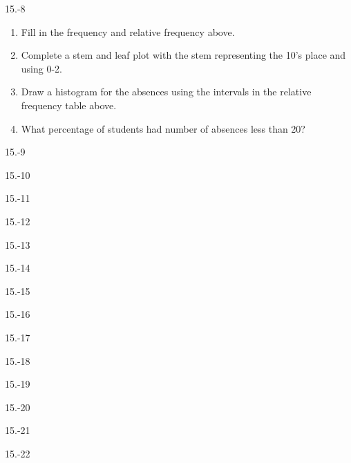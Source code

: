 \begin{exsol@solution}{15.-8}
\begin{enumerate}
  \item	Fill in the frequency and relative frequency above.
  \item	Complete a stem and leaf plot with the stem representing the 10's place and using 0-2.
  \item	Draw a histogram for the absences using the intervals in the relative frequency table above.
  \item	What percentage of students had number of absences less than 20?
\end{enumerate}

\end{exsol@solution}
\begin{exsol@solution}{15.-9}
\end{exsol@solution}
\begin{exsol@solution}{15.-10}
\end{exsol@solution}
\begin{exsol@solution}{15.-11}
\end{exsol@solution}
\begin{exsol@solution}{15.-12}
\end{exsol@solution}
\begin{exsol@solution}{15.-13}
\end{exsol@solution}
\begin{exsol@solution}{15.-14}
\end{exsol@solution}
\begin{exsol@solution}{15.-15}
\end{exsol@solution}
\begin{exsol@solution}{15.-16}
\end{exsol@solution}
\begin{exsol@solution}{15.-17}
\end{exsol@solution}
\begin{exsol@solution}{15.-18}
\end{exsol@solution}
\begin{exsol@solution}{15.-19}
\end{exsol@solution}
\begin{exsol@solution}{15.-20}
\end{exsol@solution}
\begin{exsol@solution}{15.-21}
\end{exsol@solution}
\begin{exsol@solution}{15.-22}
\end{exsol@solution}

